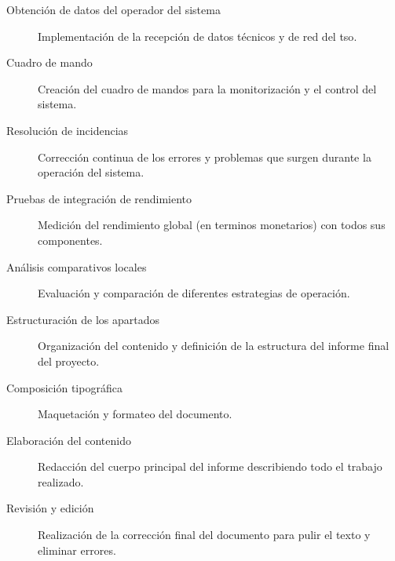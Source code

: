 \begin{description}
  \item[Obtención de datos del operador del sistema] Implementación de la recepción de datos técnicos y de red del \gls{tso}.

  \item[Cuadro de mando] Creación del cuadro de mandos para la monitorización y el control del sistema.

  \item[Resolución de incidencias] Corrección continua de los errores y problemas que surgen durante la operación del sistema.

  \item[Pruebas de integración de rendimiento] Medición del rendimiento global (en terminos monetarios) con todos sus componentes.

  \item[Análisis comparativos locales] Evaluación y comparación de diferentes estrategias de operación.

  \item[Estructuración de los apartados] Organización del contenido y definición de la estructura del informe final del proyecto.

  \item[Composición tipográfica] Maquetación y formateo del documento.

  \item[Elaboración del contenido] Redacción del cuerpo principal del informe describiendo todo el trabajo realizado.

  \item[Revisión y edición] Realización de la corrección final del documento para pulir el texto y eliminar errores.

\end{description}

